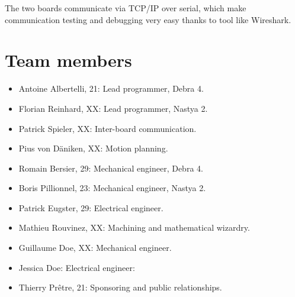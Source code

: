 \documentclass[a4paper]{paper}
\begin{document}
The two boards communicate via TCP/IP over serial, which make communication testing and debugging very easy thanks to tool like Wireshark.


\section{Team members}
\begin{itemize}
    \item Antoine Albertelli, 21:  Lead programmer, Debra 4.
    \item Florian Reinhard, XX:  Lead programmer, Nastya 2.
    \item Patrick Spieler, XX:  Inter-board communication.
    \item Pius von Däniken, XX:  Motion planning.
    \item Romain Bersier, 29:  Mechanical engineer, Debra 4.
    \item Boris Pillionnel, 23:  Mechanical engineer, Nastya 2.
    \item Patrick Eugster, 29:  Electrical engineer.
    \item Mathieu Rouvinez, XX:  Machining and mathematical wizardry.
    \item Guillaume Doe, XX: Mechanical engineer.
    \item Jessica Doe: Electrical engineer:
    \item Thierry Prêtre, 21:  Sponsoring and public relationships.
\end{itemize}

\clearpage


\end{document}
